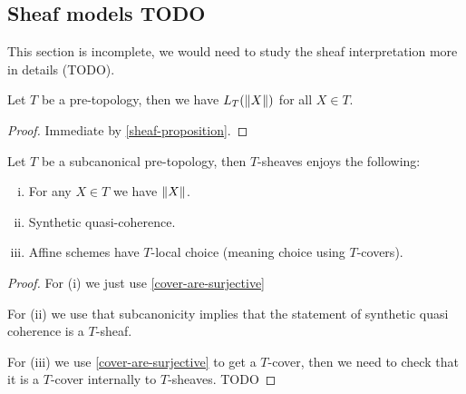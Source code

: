 \subsection{Sheaf models TODO}

This section is incomplete, we would need to study the sheaf interpretation more in details (TODO).

\begin{lemma}\label{cover-are-surjective}
Let $T$ be a pre-topology, then we have $L_T(\lVert X \rVert)$ for all $X\in T$.
\end{lemma}

\begin{proof}
Immediate by \cref{sheaf-proposition}.
\end{proof}

\begin{theorem}
Let $T$ be a subcanonical pre-topology, then $T$-sheaves enjoys the following:
\begin{enumerate}[(i)]
\item For any $X\in T$ we have $\lVert X \rVert$.
\item Synthetic quasi-coherence.
\item Affine schemes have $T$-local choice (meaning choice using $T$-covers).
\end{enumerate}
\end{theorem}

\begin{proof}
For (i) we just use \cref{cover-are-surjective}

For (ii) we use that subcanonicity implies that the statement of synthetic quasi coherence is a $T$-sheaf.

For (iii) we use \cref{cover-are-surjective} to get a $T$-cover, then we need to check that it is a $T$-cover internally to $T$-sheaves. TODO
\end{proof}




